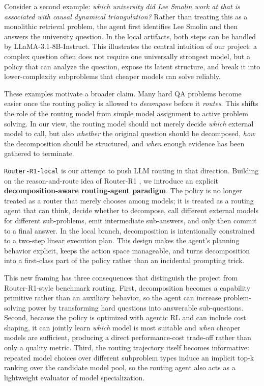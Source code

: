 \documentclass{article}
\begin{document}
Consider a second example: \emph{which university did Lee Smolin work at that is associated with causal dynamical triangulation?} Rather than treating this as a monolithic retrieval problem, the agent first identifies Lee Smolin and then answers the university question. In the local artifacts, both steps can be handled by LLaMA-3.1-8B-Instruct. This illustrates the central intuition of our project: a complex question often does not require one universally strongest model, but a policy that can analyze the question, expose its latent structure, and break it into lower-complexity subproblems that cheaper models can solve reliably.

These examples motivate a broader claim. Many hard QA problems become easier once the routing policy is allowed to \emph{decompose} before it \emph{routes}. This shifts the role of the routing model from simple model assignment to active problem solving. In our view, the routing model should not merely decide \emph{which} external model to call, but also \emph{whether} the original question should be decomposed, \emph{how} the decomposition should be structured, and \emph{when} enough evidence has been gathered to terminate.

\texttt{Router-R1-local} is our attempt to push LLM routing in that direction. Building on the reason-and-route idea of Router-R1 \cite{routerr1}, we introduce an explicit \textbf{decomposition-aware routing-agent paradigm}. The policy is no longer treated as a router that merely chooses among models; it is treated as a routing agent that can think, decide whether to decompose, call different external models for different sub-problems, emit intermediate sub-answers, and only then commit to a final answer. In the local branch, decomposition is intentionally constrained to a two-step linear execution plan. This design makes the agent's planning behavior explicit, keeps the action space manageable, and turns decomposition into a first-class part of the policy rather than an incidental prompting trick.

This new framing has three consequences that distinguish the project from Router-R1-style benchmark routing. First, decomposition becomes a capability primitive rather than an auxiliary behavior, so the agent can increase problem-solving power by transforming hard questions into answerable sub-questions. Second, because the policy is optimized with agentic RL and can include cost shaping, it can jointly learn \emph{which} model is most suitable and \emph{when} cheaper models are sufficient, producing a direct performance-cost trade-off rather than only a quality metric. Third, the routing trajectory itself becomes informative: repeated model choices over different subproblem types induce an implicit top-k ranking over the candidate model pool, so the routing agent also acts as a lightweight evaluator of model specialization.
\end{document}
